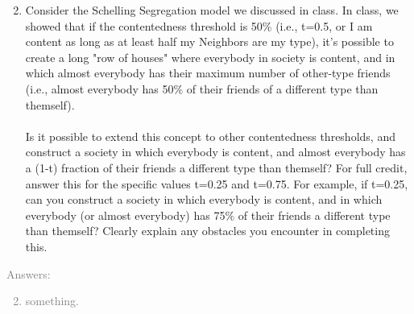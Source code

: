 \documentclass[11pt]{article}
\begin{document}
\begin{enumerate} 
	\setcounter{enumi}{1} 
	\item Consider the Schelling Segregation model we discussed in class. In class, we showed that if the contentedness threshold is 50\% (i.e., t=0.5, or I am content as long as at least half my Neighbors are my type), it's possible to create a long "row of houses" where everybody in society is content, and in which almost everybody has their maximum number of other-type friends (i.e., almost everybody has 50\% of their friends of a different type than themself).\\\\

Is it possible to extend this concept to other contentedness thresholds, and construct a society in which everybody is content, and almost everybody has a (1-t) fraction of their friends a different type than themself? For full credit, answer this for the specific values t=0.25 and t=0.75. For example, if t=0.25, can you construct a society in which everybody is content, and in which everybody (or almost everybody) has 75\% of their friends a different type than themself? Clearly explain any obstacles you encounter in completing this.\\
\end {enumerate}
	\textcolor{gray}{
	Answers:
	\begin{enumerate} 
	\setcounter{enumi}{1} 
		\item something.
	\end {enumerate}}
\end{document}
